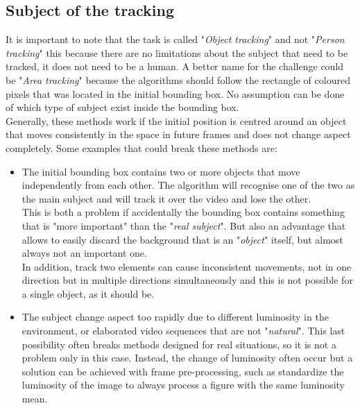 \subsection{Subject of the tracking}
It is important to note that the task is called "\textit{Object tracking}" and not "\textit{Person tracking}" this because there are no limitations about the subject that need to be tracked, it does not need to be a human. A better name for the challenge could be "\textit{Area tracking}" because the algorithms should follow the rectangle of coloured pixels that was located in the initial bounding box. No assumption can be done of which type of subject exist inside the bounding box.\\
Generally, these methods work if the initial position is centred around an object that moves consistently in the space in future frames and does not change aspect completely. Some examples that could break these methods are:
\begin{itemize}
	\item The initial bounding box contains two or more objects that move independently from each other. The algorithm will recognise one of the two as the main subject and will track it over the video and lose the other. \\
	This is both a problem if accidentally the bounding box contains something that is "more important" than the "\textit{real subject}". But also an advantage that allows to easily discard the background that is an "\textit{object}" itself, but almost always not an important one.\\
	In addition, track two elements can cause inconsistent movements, not in one direction but in multiple directions simultaneously and this is not possible for a single object, as it should be.
	\item The subject change aspect too rapidly due to different luminosity in the environment, or elaborated video sequences that are not "\textit{natural}". This last possibility often breaks methods designed for real situations, so it is not a problem only in this case. Instead, the change of luminosity often occur but a solution can be achieved with frame pre-processing, such as standardize the luminosity of the image to always process a figure with the same luminosity mean.
\end{itemize}



